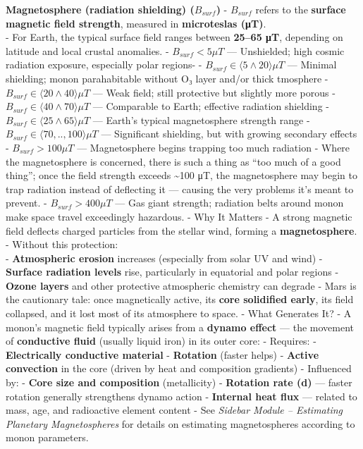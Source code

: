 \documentclass[
  letterpaper,
]{book}
\begin{document}
\textbf{Magnetosphere (radiation shielding) (\(B_{surf}\))} -
\(B_{surf}\) refers to the \textbf{surface magnetic field strength},
measured in \textbf{microteslas (μT)}.\\
- For Earth, the typical surface field ranges between \textbf{25--65
μT}, depending on latitude and local crustal anomalies. -
\(B_{surf} \lt 5 \mu T\) --- Unshielded; high cosmic radiation exposure,
especially polar regions- -
\(B_{surf} \in \langle5 \wedge 20\rangle \mu T\) --- Minimal shielding;
monon parahabitable without O₃ layer and/or thick tmosphere -
\(B_{surf} \in \langle20 \wedge 40\rangle \mu T\) --- Weak field; still
protective but slightly more porous -
\(B_{surf} \in \langle40 \wedge 70\rangle \mu T\) --- Comparable to
Earth; effective radiation shielding -
\(B_{surf} \in \langle25 \wedge 65\rangle \mu T\) --- Earth's typical
magnetosphere strength range -
\(B_{surf} \in \langle70, ..,100\rangle \mu T\) --- Significant
shielding, but with growing secondary effects -
\(B_{surf} \gt 100 \mu T\) --- Magnetosphere begins trapping too much
radiation - Where the magnetosphere is concerned, there is such a thing
as ``too much of a good thing''; once the field strength exceeds
\textasciitilde100 μT, the magnetosphere may begin to trap radiation
instead of deflecting it --- causing the very problems it's meant to
prevent. - \(B_{surf} \gt 400 \mu T\) --- Gas giant strength; radiation
belts around monon make space travel exceedingly hazardous. - Why It
Matters - A strong magnetic field deflects charged particles from the
stellar wind, forming a \textbf{magnetosphere}.\\
- Without this protection:\\
- \textbf{Atmospheric erosion} increases (especially from solar UV and
wind) - \textbf{Surface radiation levels} rise, particularly in
equatorial and polar regions - \textbf{Ozone layers} and other
protective atmospheric chemistry can degrade - Mars is the cautionary
tale: once magnetically active, its \textbf{core solidified early}, its
field collapsed, and it lost most of its atmosphere to space. - What
Generates It? - A monon's magnetic field typically arises from a
\textbf{dynamo effect} --- the movement of \textbf{conductive fluid}
(usually liquid iron) in its outer core: - Requires: -
\textbf{Electrically conductive material} - \textbf{Rotation} (faster
helps) - \textbf{Active convection} in the core (driven by heat and
composition gradients) - Influenced by: - \textbf{Core size and
composition} (metallicity) - \textbf{Rotation rate (d)} --- faster
rotation generally strengthens dynamo action - \textbf{Internal heat
flux} --- related to mass, age, and radioactive element content - See
\emph{Sidebar Module -- Estimating Planetary Magnetospheres} for details
on estimating magnetospheres according to monon parameters.
\end{document}
